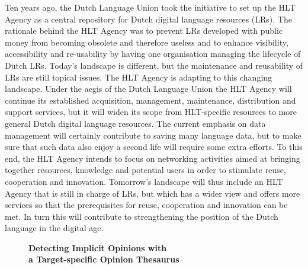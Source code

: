 \documentclass[10pt, a4paper, twopage, headinclude, footinclude, BCOR5mm]{scrartcl}
\begin{document}
{{\noindent
Ten years ago, the Dutch Language Union took the initiative to set up the HLT Agency as a central repository for Dutch digital language resources (LRs). The rationale behind the HLT Agency was to prevent LRs developed with public money from becoming obsolete and therefore useless and to enhance visibility, accessibility and re-usability by having one organisation managing the lifecycle of Dutch LRs.  Today’s landscape is different, but the maintenance and reusability of LRs are still topical issues. The HLT Agency is adapting to this changing landscape. Under the aegis of the Dutch Language Union the HLT Agency will continue its established acquisition, management, maintenance, distribution and support services, but it will widen its scope from HLT-specific resources to more general Dutch digital language resources. The current emphasis on data management will certainly contribute to saving many language data, but to make sure that such data also enjoy a second life will require some extra efforts. To this end, the HLT Agency intends to focus on networking activities aimed at bringing together resources, knowledge and potential users in order to stimulate reuse, cooperation and innovation.  Tomorrow’s landscape will thus include an HLT Agency that is still in charge of LRs, but which has a wider view and offers more services so that the prerequisites for reuse, cooperation and innovation can be met. In turn this will contribute to strengthening the position of the Dutch language in the digital age.


\newpage

\begin{figure}[t!]
\centering
\large\textbf{Detecting Implicit Opinions with \\ a Target-specific Opinion Thesaurus}
\vspace*{0.5cm}
\end{figure}


        \begin{table}[t!]
    \end{table}

}}
\end{document}
